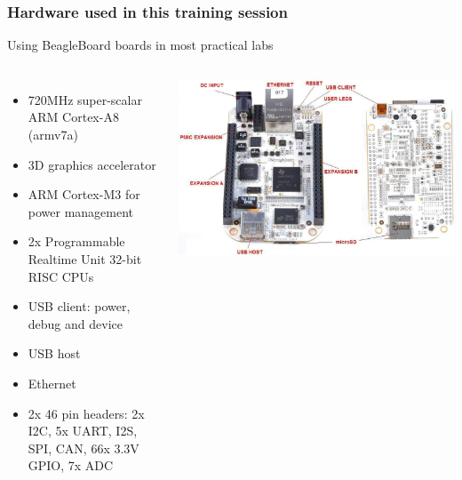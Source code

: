 \begin{frame}
\frametitle{Hardware used in this training session}
  Using BeagleBoard boards in most practical labs
  \begin{columns}
    \begin{itemize}
        \item 720MHz super-scalar ARM Cortex-A8 (armv7a)
        \item 3D graphics accelerator
        \item ARM Cortex-M3 for power management
        \item 2x Programmable Realtime Unit 32-bit RISC CPUs
        \item USB client: power, debug and device
        \item USB host
        \item Ethernet
        \item 2x 46 pin headers: 2x I2C, 5x UART, I2S, SPI, CAN, 66x 3.3V GPIO, 7x ADC
    \end{itemize}
    \includegraphics[width=\textwidth]{slides/beaglebone-board/beaglebone-board.jpg}
  \end{columns}
\end{frame}

